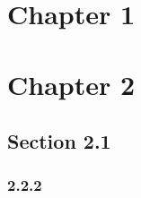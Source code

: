 \documentclass[12pt]{article}
\begin{document}
\tableofcontents

\section{Chapter 1}


\section{Chapter 2}

\subsection{Section 2.1}

\subsubsection{2.2.2}
\end{document}

